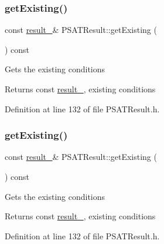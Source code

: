 \subsubsection{\texorpdfstring{get\+Existing()}{getExisting()}\hspace{0.1cm}{\footnotesize\ttfamily [1/3]}}
{\footnotesize\ttfamily const \hyperlink{struct_p_s_a_t_result_1_1result__}{result\+\_\+}\& P\+S\+A\+T\+Result\+::get\+Existing (\begin{DoxyParamCaption}{ }\end{DoxyParamCaption}) const\hspace{0.3cm}{\ttfamily [inline]}}

Gets the existing conditions

\begin{DoxyReturn}{Returns}
const \hyperlink{struct_p_s_a_t_result_1_1result__}{result\+\_\+}, existing conditions 
\end{DoxyReturn}


Definition at line 132 of file P\+S\+A\+T\+Result.\+h.

\mbox{\label{class_p_s_a_t_result_a4da660959f368bdf0951728c9c5f931b}} 
\subsubsection{\texorpdfstring{get\+Existing()}{getExisting()}\hspace{0.1cm}{\footnotesize\ttfamily [2/3]}}
{\footnotesize\ttfamily const \hyperlink{struct_p_s_a_t_result_1_1result__}{result\+\_\+}\& P\+S\+A\+T\+Result\+::get\+Existing (\begin{DoxyParamCaption}{ }\end{DoxyParamCaption}) const\hspace{0.3cm}{\ttfamily [inline]}}

Gets the existing conditions

\begin{DoxyReturn}{Returns}
const \hyperlink{struct_p_s_a_t_result_1_1result__}{result\+\_\+}, existing conditions 
\end{DoxyReturn}


Definition at line 132 of file P\+S\+A\+T\+Result.\+h.

\mbox{\label{class_p_s_a_t_result_a4da660959f368bdf0951728c9c5f931b}} 
